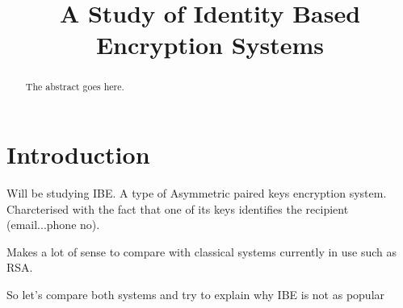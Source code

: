 \documentclass[conference]{IEEEtran}
\begin{document}
%
\title{A Study of Identity Based Encryption Systems}

\author{
}

\maketitle

\begin{abstract}
The abstract goes here.
\end{abstract}

\section{Introduction}
Will be studying IBE. A type of Asymmetric paired keys 
encryption system. Charcterised with the fact that one of its
keys identifies the recipient (email...phone no).

Makes a lot of sense to compare with classical 
systems currently in use such as RSA.

So let's compare both systems and try to explain why IBE is not as popular
\end{document}
